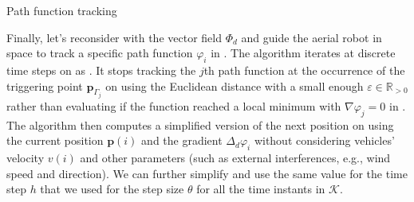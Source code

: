 \begin{algorithm}[h!] %

  \DontPrintSemicolon
  \vspace{.8ex}

  \vspace{1.6ex}

  \caption{Path function tracking}
  \label{algo:track}
\end{algorithm}

Finally, let's reconsider  with the vector field $\varPhi_d$ and guide the aerial robot in space to track a specific path function $\varphi_i$ in . The algorithm iterates at discrete time steps on  as . It stops tracking the $j$th path function at the occurrence of the triggering point $\mathbf{p}_{\Gamma_j}$ on  using the Euclidean distance with a small enough $\varepsilon\in\mathbb{R}_{>0}$ rather than evaluating if the function reached a local minimum with $\nabla\varphi_j=0$ in . The algorithm then computes a simplified version of the next position  on  using the current position $\mathbf{p}(i)$ and the gradient $\Delta_d\varphi_i$ without considering vehicles' velocity $v(i)$ and other parameters (such as external interferences, e.g., wind speed and direction). We can further simplify  and use the same value for the time step $h$ that we used for the step size $\theta$ for all the time instants in $\mathcal{K}$.

